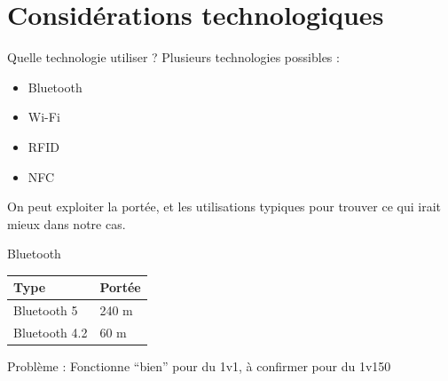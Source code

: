 \documentclass[aspectratio=169]{beamer}
\begin{document}
\section{Considérations technologiques}

\begin{frame}{Quelle technologie utiliser ?}
    Plusieurs technologies possibles :
    \begin{itemize}
        \item Bluetooth
        \item Wi-Fi
        \item RFID
        \item NFC
    \end{itemize}

    \bigskip
    
    On peut exploiter la portée, et les utilisations typiques pour trouver ce qui irait mieux dans notre cas.
\end{frame}


\begin{frame}{Bluetooth}
    

\begin{table}[]
\begin{tabular}{|l|l|}
\hline
Type          & Portée \\ \hline
Bluetooth 5   & 240 m  \\ \hline
Bluetooth 4.2 & 60 m   \\ \hline
\end{tabular}
\end{table}

\bigskip

Problème : Fonctionne “bien” pour du 1v1, à confirmer pour du 1v150

\end{frame}
\end{document}
